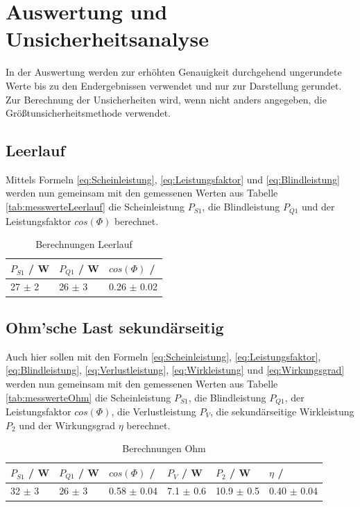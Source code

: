 \documentclass[12pt,a4paper,twoside]{article}
\begin{document}
\section{Auswertung und Unsicherheitsanalyse} %

In der Auswertung werden zur erhöhten Genauigkeit durchgehend ungerundete Werte bis zu den Endergebnissen verwendet und nur zur Darstellung gerundet. \\
Zur Berechnung der Unsicherheiten wird, wenn nicht anders angegeben, die Größtunsicherheitsmethode verwendet.

\subsection{Leerlauf}

Mittels Formeln \ref{eq:Scheinleistung}, \ref{eq:Leistungsfaktor} und \ref{eq:Blindleistung} werden nun gemeinsam mit den gemessenen Werten aus Tabelle \ref{tab:messwerteLeerlauf} die Scheinleistung $P_{S1}$, die Blindleistung $P_{Q1}$ und der Leistungsfaktor $cos(\Phi)$ berechnet.

\begin{table}[H]
    \centering
    \caption{Berechnungen Leerlauf}
    \label{tab:BerechnungenLeerlauf}
    \begin{tabular}{| l | l | l |}
        \hline
        $P_{S1}$ / W & $P_{Q1}$ / W & $cos(\Phi)$ / \\
        \hline
        27 $\pm$ 2 & 26 $\pm$ 3 & 0.26 $\pm$ 0.02 \\
        \hline
    \end{tabular}
\end{table}


\subsection{Ohm'sche Last sekundärseitig}

Auch hier sollen mit den Formeln \ref{eq:Scheinleistung}, \ref{eq:Leistungsfaktor}, \ref{eq:Blindleistung}, \ref{eq:Verlustleistung}, \ref{eq:Wirkleistung} und \ref{eq:Wirkungsgrad} werden nun gemeinsam mit den gemessenen Werten aus Tabelle \ref{tab:messwerteOhm} die Scheinleistung $P_{S1}$, die Blindleistung $P_{Q1}$, der Leistungsfaktor $cos(\Phi)$, die Verlustleistung $P_{V}$, die sekundärseitige Wirkleistung $P_{2}$ und der Wirkungsgrad $\eta$ berechnet.

\begin{table}[H]
    \centering
    \caption{Berechnungen Ohm}
    \label{tab:BerechnungenOhm}
    \begin{tabular}{| l | l | l | l | l | l |}
        \hline
        $P_{S1}$ / W & $P_{Q1}$ / W & $cos(\Phi)$ / & $P_{V}$ / W & $P_{2}$ / W & $\eta$ / \\
        \hline
        32 $\pm$ 3 & 26 $\pm$ 3 & 0.58 $\pm$ 0.04 & 7.1 $\pm$ 0.6 & 10.9 $\pm$ 0.5 & 0.40 $\pm$ 0.04 \\
        \hline
    \end{tabular}
\end{table}
\end{document}
